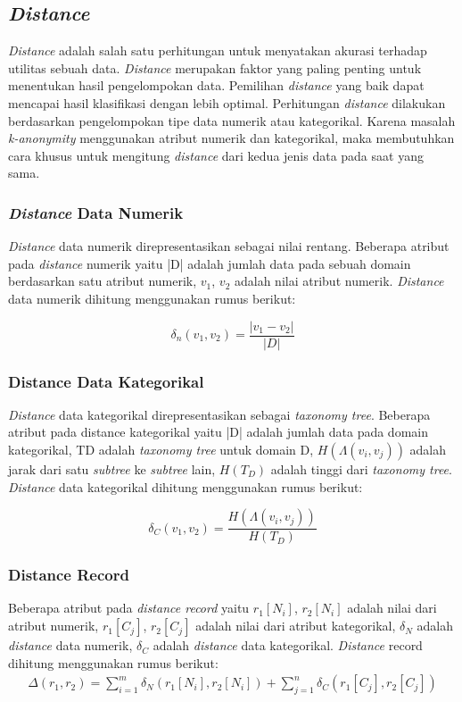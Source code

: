 \subsection{\textit{Distance}} 
\textit{Distance} adalah salah satu perhitungan untuk menyatakan akurasi terhadap utilitas sebuah data. \textit{Distance} merupakan faktor yang paling penting untuk menentukan hasil pengelompokan data. Pemilihan \textit{distance} yang baik dapat mencapai hasil klasifikasi dengan lebih optimal. Perhitungan \textit{distance} dilakukan berdasarkan pengelompokan tipe data numerik atau kategorikal. Karena masalah \textit{k-anonymity} menggunakan atribut numerik dan kategorikal, maka membutuhkan cara khusus untuk mengitung \textit{distance} dari kedua jenis data pada saat yang sama. 

\subsubsection{\textit{Distance} Data Numerik}
\textit{Distance} data numerik direpresentasikan sebagai nilai rentang. Beberapa atribut pada \textit{distance} numerik yaitu |D| adalah jumlah data pada sebuah domain berdasarkan satu atribut numerik, $v_1$, $v_2$ adalah nilai atribut numerik. \textit{Distance} data numerik dihitung menggunakan rumus berikut:

\begin{equation}
\delta_n(v_1,v_2) = \frac{|v_1 - v_2|}{|D|} 
\end{equation}

\subsubsection{Distance Data Kategorikal}
\textit{Distance} data kategorikal direpresentasikan sebagai \textit{taxonomy tree}. Beberapa atribut pada distance kategorikal yaitu |D| adalah jumlah data pada domain kategorikal, TD adalah \textit{taxonomy tree} untuk domain D,  $H(\Lambda(v_i,v_j))$ adalah jarak dari satu \textit{subtree} ke \textit{subtree} lain, $H(T_D)$ adalah tinggi dari \textit{taxonomy tree}. \textit{Distance} data kategorikal dihitung menggunakan rumus berikut:

\begin{equation}
\delta_C(v_1,v_2) = \frac{H(\Lambda(v_i,v_j))}{H(T_D)} 
\end{equation}

\subsubsection{Distance Record}
Beberapa atribut pada \textit{distance record} yaitu $r_1[N_i]$, $r_2[N_i]$ adalah nilai dari atribut numerik, $r_1[C_j]$, $r_2[C_j]$ adalah nilai dari atribut kategorikal, $\delta_N$ adalah \textit{distance} data numerik, $\delta_C$ adalah \textit{distance} data kategorikal. \textit{Distance} record dihitung menggunakan rumus berikut:
\begin{align}
\Delta (r_1,r_2) = \sum_{i=1}^{m} \delta_N(r_1[N_i],r_2	[N_i]) +  \sum_{j=1}^{n} \delta_C(r_1[C_j],r_2[C_j])
\end{align}


